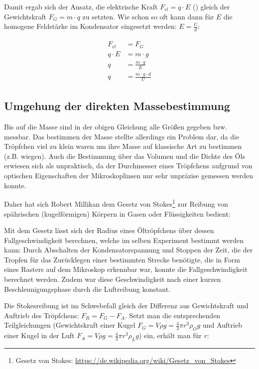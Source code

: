 Damit ergab sich der Ansatz, die elektrische Kraft $F_{el}=q \cdot E$ () gleich der Gewichtskraft $F_G = m \cdot q$ zu setzten. Wie schon so oft kann dann für $E$ die homogene Feldstärke im Kondensator eingesetzt werden: $E = \frac{U}{d}$:

\begin{align} \label{eq:MillikanAnsatz}
\begin{split}
	F_{el} &= F_G \\
	q \cdot E &= m \cdot g \\
	q &= \frac{m \cdot g}{E} \\
	q &= \frac{m \cdot g \cdot d}{U}
\end{split}
\end{align}


\subsection{Umgehung der direkten Massebestimmung}

Bis auf die Masse sind in der obigen Gleichung alle Größen gegeben bzw. messbar. Das bestimmen der Masse stellte allerdings ein Problem dar, da die Tröpfchen viel zu klein waren um ihre Masse auf klassische Art zu bestimmen (z.B. wiegen). Auch die Bestimmung über das Volumen und die Dichte des Öls erwiesen sich als unpraktisch, da der Durchmesser eines Tröpfchens aufgrund von optischen Eigenschaften der Mikroskoplinsen nur sehr unpräzise gemessen werden konnte.

Daher hat sich Robert Millikan dem Gesetz von Stokes\footnote{Gesetz von Stokes: \url{https://de.wikipedia.org/wiki/Gesetz_von_Stokes}} zur Reibung von spährischen (\glqq kugelförmigen\grqq) Körpern in Gasen oder Flüssigkeiten bedient: 

Mit dem Gesetz lässt sich der Radius eines Öltröpfchens über dessen Fallgeschwindigkeit berechnen, welche im selben Experiment bestimmt werden kann: Durch Abschalten der Kondensatorspannung und Stoppen der Zeit, die der Tropfen für das Zurücklegen einer bestimmten Strecke benötigte, die in Form eines Rasters auf dem Mikroskop erkennbar war, konnte die Fallgeschwindigkeit berechnet werden. Zudem war diese Geschwindigkeit nach einer kurzen Beschleunigungsphase durch die Luftreibung konstant.

Die Stokesreibung ist im Schwebefall gleich der Differenz aus Gewichtskraft und Auftrieb des Tröpfchens: $F_R = F_G - F_A$. Setzt man die entsprechenden Teilgleichungen (Gewichtskraft einer Kugel $F_G = V \rho g = \frac{4}{3} \pi r^3 \rho_{O} g$ und Auftrieb einer Kugel in der Luft $F_A = V \rho g = \frac{4}{3} \pi r^3 \rho_L g$) ein, erhält man für $r$:

